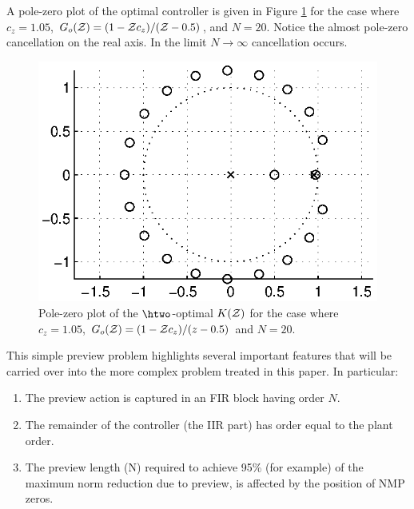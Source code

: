 A pole-zero plot of the optimal controller is given in Figure \ref{fig:PZforSISOPrevH2} for the case where $c_z=1.05$, $G_o(\mathcal{Z})=(1-\mathcal{Z} c_z)/(\mathcal{Z}-0.5)$, and $N=20$. Notice the almost pole-zero cancellation on the real axis. In the limit $N\rightarrow \infty$ cancellation occurs. 
\begin{figure}
\begin{center}
\includegraphics[width=0.7\columnwidth]{./diags/SimpleExamplePZPlot2.eps}
\end{center}
\caption{Pole-zero plot of the $\htwo$-optimal $K(\mathcal{Z})$ for the case where $c_z=1.05$, $G_o(\mathcal{Z})=(1-\mathcal{Z} c_z)/(z-0.5)$ and $N=20$.   }
\label{fig:PZforSISOPrevH2}
\end{figure}
This simple preview problem highlights several important features that will be carried over into the more complex problem treated in this paper. In particular:
\begin{enumerate}
\item The preview action is captured in an {FIR} block having order $N$.
\item The remainder of the controller (the {IIR} part) has order equal to the plant order.
\item The preview length (N) required to achieve 95\% (for example) of the maximum norm reduction due to preview, is affected by the position of {NMP} zeros. 
\end{enumerate} 


